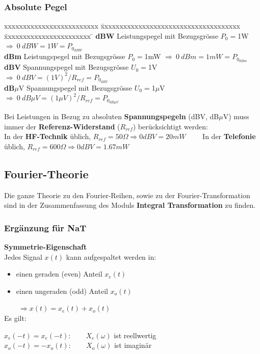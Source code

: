 \subsubsection{Absolute Pegel}
	\begin{tabbing}
	xxxxxxxxxxxxxxxxxxxxxxxxx \= xxxxxxxxxxxxxxxxxxxxxxxxxxxxxxxxxxxxx  \= xxxxxxxxxxxxxxxxxxxxxxx \=\kill
	\textbf{dBW} \> Leistungspegel mit Bezugsgrösse $P_0 = $1W \> $\Longrightarrow \: 0 \: dBW = 1W = P_{0_{dBW}}$\\
	\textbf{dBm} \> Leistungspegel mit Bezugsgrösse $P_0 = $1mW \> $\Longrightarrow \: 0 \: dBm = 1mW = P_{0_{dBm}}$\\
	\textbf{dBV} \> Spannungspegel mit Bezugsgrösse $U_0 = $1V \> $\Longrightarrow \: 0 \: dBV = (1V)^2/R_{ref} = P_{0_{dBV}}$\\
	\textbf{dB}$\mu$V \> Spannungspegel mit Bezugsgrösse $U_0 = $1$\mu$V \> $\Longrightarrow \: 0 \: dB \mu V = (1 \mu V)^2/R_{ref} = P_{0_{dB\mu V}}$
	\end{tabbing}
Bei Leistungen in Bezug zu absoluten \textbf{Spannungspegeln} (dBV, dB$\mu$V) muss immer der \textbf{Referenz-Widerstand} ($R_{ref}$) berücksichtigt werden: \\
In der \textbf{HF-Technik} üblich, $R_{ref} = 50 \Omega \Rightarrow 0 dBV = 20 mW \qquad $
In der \textbf{Telefonie} üblich, $R_{ref} = 600  \Omega \Rightarrow 0 dBV =
1.67 mW$ 

\subsection{Fourier-Theorie}
	Die ganze Theorie zu den Fourier-Reihen, sowie zu der Fourier-Transformation sind in der Zusammenfassung des Moduls \textbf{Integral Transformation} zu finden.

\subsubsection{Ergänzung für NaT}
	\textbf{Symmetrie-Eigenschaft}\\
		Jedes Signal $x(t)$ kann aufgespaltet werden in:
		\parbox{6.5cm}{
			\begin{itemize}
				\item einen geraden (even) Anteil $x_e(t)$
				\item einen ungeraden (odd) Anteil $x_o(t)$
			\end{itemize}
		}
		$\qquad \Rightarrow x(t) = x_e(t) + x_o(t)$\\
		Es gilt:  $\quad$
		\parbox[t]{7cm}{
			$x_e(-t) = x_e(-t) : \qquad X_e(\omega)$ ist reellwertig\\
			\hspace{1cm} $x_o(-t) = -x_o(t) : \qquad X_o(\omega)$ ist imaginär
		}\\
		
